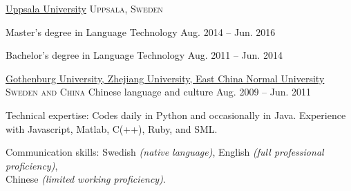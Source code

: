 \documentclass[10pt,a4paper]{article}
\begin{document}
\headedsection
  {\href{http://www.uu.se/en/}{Uppsala University}}
  {\textsc{Uppsala, Sweden}} {%

  \headedsubsection
    {Master's degree in Language Technology}
    {Aug. 2014 -- Jun. 2016}
    {}

  \headedsubsection
    {Bachelor's degree in Language Technology}
    {Aug. 2011 -- Jun. 2014}
    {}

}

\headedsection
  {\href{http://gu.se/english/}{Gothenburg University, Zhejiang University, East China Normal University}}
  {\textsc{Sweden and China}} {%
  \headedsubsection
    {Chinese language and culture}
    {Aug. 2009 -- Jun. 2011} {}
}

\spacedhrule{0.5em}{-0.4em}


\inlineheadsection  %
  {Technical expertise:}
  {Codes daily in Python and occasionally in Java. Experience with Javascript, Matlab, C(++), Ruby, and SML.}

\vspace{0.5em}
\inlineheadsection
  {Communication skills:}
  {Swedish \emph{(native language)}, English \emph{(full professional proficiency)}, \\Chinese \emph{(limited working proficiency)}.}
\end{document}
